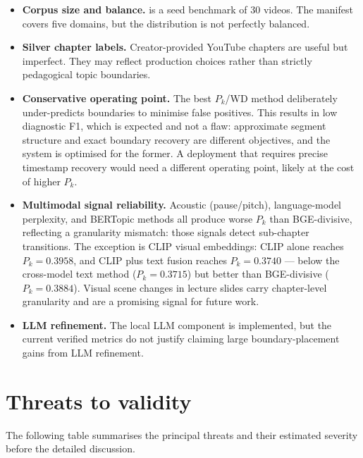 \begin{itemize}
  \item \textbf{Corpus size and balance.}
    \dataset{} is a seed benchmark of 30 videos. The manifest covers five
    domains, but the distribution is not perfectly balanced.

  \item \textbf{Silver chapter labels.}
    Creator-provided YouTube chapters are useful but imperfect. They may reflect
    production choices rather than strictly pedagogical topic boundaries.

  \item \textbf{Conservative operating point.}
    The best $P_k$/WD method deliberately under-predicts boundaries to minimise
    false positives. This results in low diagnostic F1, which is expected and
    not a flaw: approximate segment structure and exact boundary recovery are
    different objectives, and the system is optimised for the former.
    A deployment that requires precise timestamp recovery would need a different
    operating point, likely at the cost of higher $P_k$.

  \item \textbf{Multimodal signal reliability.}
    Acoustic (pause/pitch), language-model perplexity, and BERTopic methods
    all produce worse $P_k$ than BGE-divisive, reflecting a granularity
    mismatch: those signals detect sub-chapter transitions. The exception is
    CLIP visual embeddings: CLIP alone reaches $P_k=0.3958$, and CLIP plus
    text fusion reaches $P_k=0.3740$ --- below the cross-model text method
    ($P_k=0.3715$) but better than BGE-divisive ($P_k=0.3884$). Visual scene
    changes in lecture slides carry chapter-level granularity and are a
    promising signal for future work.

  \item \textbf{LLM refinement.}
    The local LLM component is implemented, but the current verified metrics do
    not justify claiming large boundary-placement gains from LLM refinement.
\end{itemize}

\section{Threats to validity}
\label{sec:threats_validity}

The following table summarises the principal threats and their estimated
severity before the detailed discussion.

